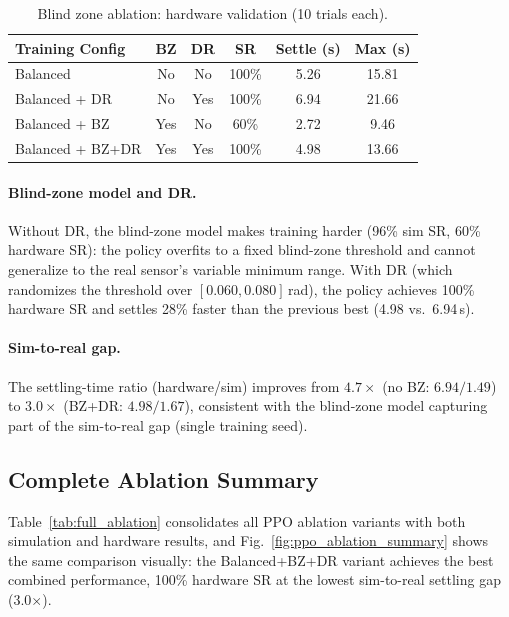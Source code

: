 \begin{table}[!t]
\centering
\renewcommand{\arraystretch}{1.15}
\caption{Blind zone ablation: hardware validation (10 trials each).}
\label{tab:blind_zone_hw}
\begin{tabular}{lccccc}
\toprule
\textbf{Training Config} & \textbf{BZ} & \textbf{DR}
  & \textbf{SR} & \textbf{Settle (s)} & \textbf{Max (s)} \\
\midrule
Balanced          & No    & No    & 100\% & 5.26 & 15.81 \\
Balanced + DR     & No    & Yes & 100\% & 6.94 & 21.66 \\
Balanced + BZ     & Yes & No    &  60\% & 2.72 &  9.46 \\
Balanced + BZ+DR  & Yes & Yes & 100\% & 4.98 & 13.66 \\
\bottomrule
\end{tabular}
\end{table}

\paragraph{Blind-zone model and DR.}
Without DR, the blind-zone model makes training harder (96\% sim SR,
60\% hardware SR): the policy overfits to a fixed blind-zone
threshold and cannot generalize to the real sensor's variable
minimum range.
With DR (which randomizes the threshold over
$[0.060, 0.080]$\,rad), the policy achieves 100\% hardware SR
and settles 28\% faster than the previous best (4.98 vs.\ 6.94\,s).

\paragraph{Sim-to-real gap.}
The settling-time ratio (hardware/sim) improves from
$4.7\times$ (no BZ: $6.94/1.49$) to $3.0\times$ (BZ+DR:
$4.98/1.67$), consistent with the blind-zone model
capturing part of the sim-to-real gap (single training seed).

\subsection{Complete Ablation Summary}
\label{appendix:ablation_summary}

Table~\ref{tab:full_ablation} consolidates all PPO ablation
variants with both simulation and hardware results, and
Fig.~\ref{fig:ppo_ablation_summary} shows the same comparison visually: the
Balanced+BZ+DR variant achieves the best combined performance, 100\% hardware
SR at the lowest sim-to-real settling gap (3.0$\times$).

